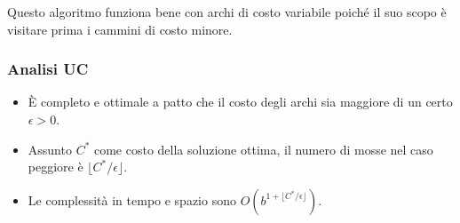 Questo algoritmo funziona bene con archi di costo variabile poich\'e il suo scopo \`e visitare prima i
cammini di costo minore.

\subsubsection{Analisi UC}
\begin{itemize}
	\item \`E completo e ottimale a patto che il costo degli archi sia maggiore di un certo
	      $\epsilon > 0$.
	\item Assunto $C^*$ come costo della soluzione ottima, il numero di mosse nel caso peggiore \`e
	      $\lfloor C^*/\epsilon \rfloor$.
	\item Le complessit\`a in tempo e spazio sono $O(b^{1+\lfloor C^*/\epsilon \rfloor})$.
\end{itemize}
